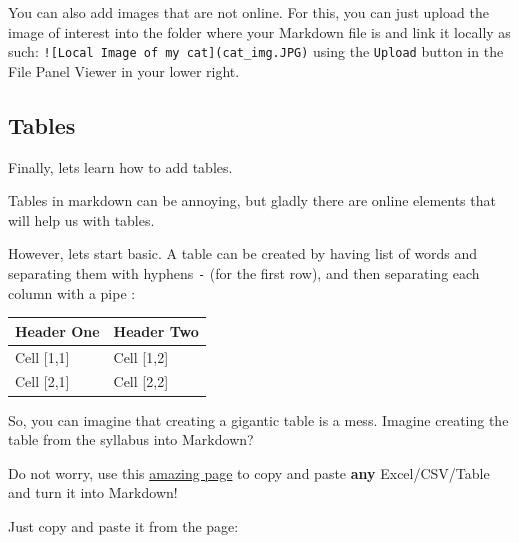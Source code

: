 \documentclass[
]{book}
\begin{document}
You can also add images that are not online. For this, you can just upload the image of interest into the folder where your Markdown file is and link it locally as such: \texttt{!{[}Local\ Image\ of\ my\ cat{]}(cat\_img.JPG)} using the \texttt{Upload} button in the File Panel Viewer in your lower right.

\hypertarget{tables}{%
\subsection{Tables}\label{tables}}

Finally, lets learn how to add tables.

Tables in markdown can be annoying, but gladly there are online elements that will help us with tables.

However, lets start basic. A table can be created by having list of words and separating them with hyphens \texttt{-} (for the first row), and then separating each column with a pipe \texttt{\textbar{}}:

\begin{longtable}[]{@{}ll@{}}
\toprule()
Header One & Header Two \\
\midrule()
\endhead
Cell {[}1,1{]} & Cell {[}1,2{]} \\
Cell {[}2,1{]} & Cell {[}2,2{]} \\
\bottomrule()
\end{longtable}

So, you can imagine that creating a gigantic table is a mess. Imagine creating the table from the syllabus into Markdown?

Do not worry, use this \href{https://www.tablesgenerator.com/markdown_tables}{amazing page} to copy and paste \textbf{any} Excel/CSV/Table and turn it into Markdown!

Just copy and paste it from the page:
\end{document}
